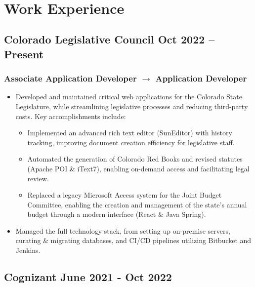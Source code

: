 \documentclass{article}
\begin{document}
	\begin{center}
    {\sffamily\LARGE\bfseries {}} \par\bigskip
		\sffamily\footnotesize {} \\ \medskip
		 \par
	\end{center}
	
\section{Work Experience}
	\subsection{Colorado Legislative Council \hfill Oct 2022 – Present}
	\subsubsection{Associate Application Developer $\rightarrow$ Application Developer} 
      	\begin{itemize}
      		\item Developed and maintained critical web applications for the Colorado State Legislature, while streamlining legislative processes and reducing third-party costs. Key accomplishments include:
      		\begin{itemize}
      			\item Implemented an advanced rich text editor (SunEditor) with history tracking, improving document creation efficiency for legislative staff.
      			\item Automated the generation of Colorado Red Books and revised statutes (Apache POI \& iText7), enabling on-demand access and facilitating legal review.
      			\item Replaced a legacy Microsoft Access system for the Joint Budget Committee, enabling the creation and management of the state's annual budget through a modern interface (React \& Java Spring).
      		\end{itemize}
      		\item Managed the full technology stack, from setting up on-premise servers, curating \& migrating databases, and CI/CD pipelines utilizing Bitbucket and Jenkins.
      	\end{itemize}
	
	\subsection{Cognizant \hfill June 2021 - Oct 2022}
\end{document}
